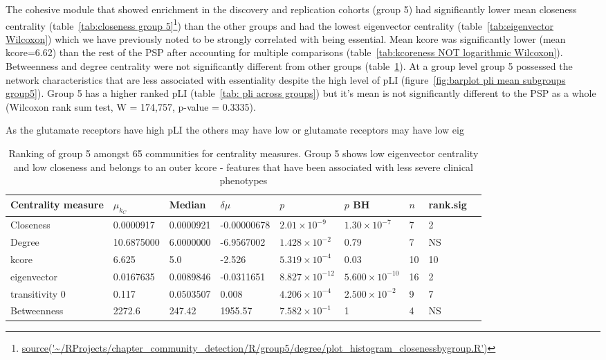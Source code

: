 The cohesive module that showed enrichment in the discovery and replication cohorts (group 5) had significantly lower mean closeness centrality (table~\ref{tab:closeness group 5}\footnote{\tiny\url{source('~/RProjects/chapter_community_detection/R/group5/degree/plot_histogram_closenessbygroup.R')}}) than the other groups and had the lowest eigenvector centrality (table~\ref{tab:eigenvector Wilcoxon}) which we have previously noted to be strongly correlated with being essential. Mean kcore was significantly lower (mean kcore=6.62) than the rest of the PSP after accounting for multiple comparisons (table~\ref{tab:kcoreness NOT logarithmic Wilcoxon}). Betweenness and degree centrality were not significantly different from other groups (table~\ref{tab:centrality_measures_for_group5}). At a group level group 5 possessed the network characteristics that are less associated with essentiality despite the high level of pLI (figure~\ref{fig:barplot pli mean subgroups group5}). Group 5 has a higher ranked pLI (table~\ref{tab: pli across groups}) but it's mean is not significantly different to the PSP as a whole (Wilcoxon rank sum test, W = 174,757, p-value = 0.3335). 

As the glutamate receptors have high pLI the others may have low or glutamate receptors may have low eig




\begin{table}[]
    \centering
    \setlength{\extrarowheight}{2pt}
    \begin{adjustbox}{width=\textwidth}
   
    \begin{tabular}{lllllllll}
    \toprule
    Centrality measure & $\mu_{k_C}$ & Median & $\delta \mu$     &$p$ & $p$ BH & $n$ & rank.sig  \\
    \midrule
    Closeness     &  0.0000917  & 0.0000921 &  -0.00000678 & $2.01\times10^{-9}$ &  $1.30\times 10^{-7}$    & 7 & 2 \\
    Degree   & 10.6875000 & 6.0000000 & -6.9567002 & $1.428 \times 10^{-2}$ & 0.79 & 7 & NS\\
    kcore &6.625 & 5.0 & -2.526 & $5.319 \times 10^{-4}$ & 0.03 & 10 & 10 \\  
    eigenvector & 0.0167635 & 0.0089846 & -0.0311651 & $8.827 \times 10^{-12}$ & $5.600 \times 10^{-10}$ & 16 & 2\\ 
    transitivity 0 & 0.117 & 0.0503507 & 0.008 & $4.206 \times 10^{-4}$ & $2.500 \times 10^{-2}$ & 9 & 7\\
    Betweenness&2272.6 & 247.42 & 1955.57 & $7.582 \times 10^{-1}$ & 1 & 4 & NS \\ 
    \bottomrule
   \end{tabular}
    \end{adjustbox}
    \caption{Ranking of group 5 amongst 65 communities for centrality measures. Group 5 shows low eigenvector centrality and low closeness and belongs to an outer kcore - features that have been associated with less severe clinical phenotypes}
    \label{tab:centrality_measures_for_group5}
\end{table}




